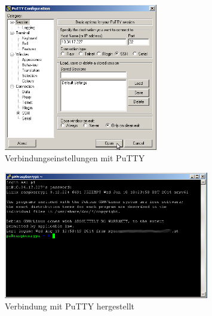 \begin{figure}[h!]
	\centering
		\includegraphics[width=0.6\textwidth]{./fotos/putty1.png}
	\caption{Verbindungseinstellungen mit PuTTY}
	\label{fig:putty1}
\end{figure}

\begin{figure}[h!]
	\centering
		\includegraphics[width=0.8\textwidth]{./fotos/putty2.png}
	\caption{Verbindung mit PuTTY hergestellt}
	\label{fig:putty2}
\end{figure}



